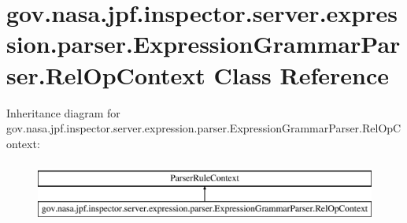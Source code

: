 \hypertarget{classgov_1_1nasa_1_1jpf_1_1inspector_1_1server_1_1expression_1_1parser_1_1_expression_grammar_parser_1_1_rel_op_context}{}\section{gov.\+nasa.\+jpf.\+inspector.\+server.\+expression.\+parser.\+Expression\+Grammar\+Parser.\+Rel\+Op\+Context Class Reference}
\label{classgov_1_1nasa_1_1jpf_1_1inspector_1_1server_1_1expression_1_1parser_1_1_expression_grammar_parser_1_1_rel_op_context}
Inheritance diagram for gov.\+nasa.\+jpf.\+inspector.\+server.\+expression.\+parser.\+Expression\+Grammar\+Parser.\+Rel\+Op\+Context\+:\begin{figure}[H]
\begin{center}
\leavevmode
\includegraphics[height=2.000000cm]{classgov_1_1nasa_1_1jpf_1_1inspector_1_1server_1_1expression_1_1parser_1_1_expression_grammar_parser_1_1_rel_op_context}
\end{center}
\end{figure}
